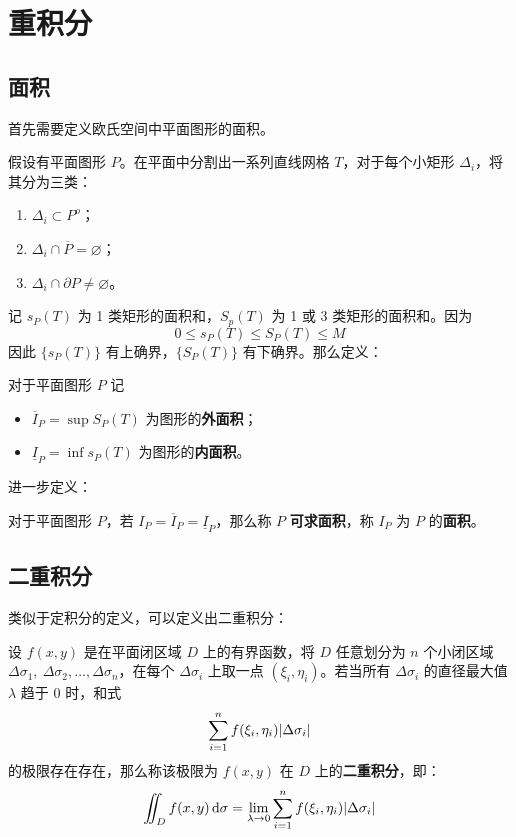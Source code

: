 \section{重积分}

\subsection{面积}

首先需要定义欧氏空间中平面图形的面积。

假设有平面图形 $P$。在平面中分割出一系列直线网格 $T$，对于每个小矩形 $\Delta_i$，将其分为三类：

\begin{enumerate}
	\item $\Delta_i \subset P^o$；
	\item $\Delta_i \cap \overline{P} = \varnothing$；
	\item $\Delta_i \cap \partial P \neq \varnothing$。
\end{enumerate}

记 $s_P(T)$ 为 1 类矩形的面积和，$S_p(T)$ 为 1 或 3 类矩形的面积和。因为
$$
0 \le s_P(T) \le S_P(T) \le M
$$
因此 $\{s_P(T)\}$ 有上确界，$\{S_P(T)\}$ 有下确界。那么定义：

\begin{definition}[外面积和内面积]
	对于平面图形 $P$ 记
	\begin{itemize}
		\item $\overline{I}_P = \sup S_P(T)$ 为图形的\textbf{外面积}；
		\item $\underline{I}_P = \inf s_P(T)$ 为图形的\textbf{内面积}。
	\end{itemize}
\end{definition}

进一步定义：

\begin{definition}[可求面积]
	对于平面图形 $P$，若 $I_P = \overline{I}_P = \underline{I}_P$，那么称 $P$ \textbf{可求面积}，称 $I_P$ 为 $P$ 的\textbf{面积}。
\end{definition}

\subsection{二重积分}

类似于定积分的定义，可以定义出二重积分：

\begin{definition}
	设 $f(x, y)$ 是在平面闭区域 $D$ 上的有界函数，将 $D$ 任意划分为 $n$ 个小闭区域 $\Delta \sigma_1,\ \Delta \sigma_2, \dots, \Delta \sigma_n$，在每个 $\Delta \sigma_i$ 上取一点 $(\xi_i, \eta_i)$。若当所有 $\Delta \sigma_i$ 的直径最大值 $\lambda$ 趋于 $0$ 时，和式
	$$
	\sum_{i = 1}^{n} f(\xi_i, \eta_i) \abs{\Delta \sigma_i}
	$$
	的极限存在存在，那么称该极限为 $f(x, y)$ 在 $D$ 上的\textbf{二重积分}，即：
	$$
	\iint_D f(x, y) \dd{\sigma} = \lim_{\lambda \to 0} \sum_{i = 1}^{n} f(\xi_i, \eta_i) \abs{\Delta \sigma_i}
	$$
\end{definition}


